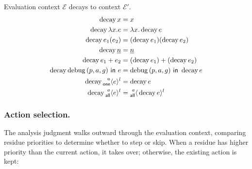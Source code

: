  Evaluation context \(\mathcal{E}\) decays to context \(\mathcal{E}'\).
\[
  \begin{aligned}
    \Decay{x} &= x \\
    \Decay{\Lam{x}{e}} &= \Lam{x}{\Decay{e}} \\
    \Decay{e_1(e_2)} &= (\Decay{e_1})(\Decay{e_2}) \\
    \Decay{\Nat{n}} &= \Nat{n} \\
    \Decay{e_1 + e_2} &= (\Decay{e_1}) + (\Decay{e_2}) \\
    \Decay{\Filter{(p, a, g)}{e}} &= \Filter{(p, a, g)}{\Decay{e}} \\
    \Decay{\Residue{a}{\GasOne}{l}{e}} &= \Decay{e} \\
    \Decay{\Residue{a}{\GasAll}{l}{e}} &= \Residue{a}{\GasAll}{l}{\Decay{e}}
  \end{aligned}
\]

\subsubsection{Action selection.} The analysis judgment walks outward
through the evaluation context, comparing residue priorities to
determine whether to step or skip. When a residue has higher priority
than the current action, it takes over; otherwise, the existing action
is kept:

